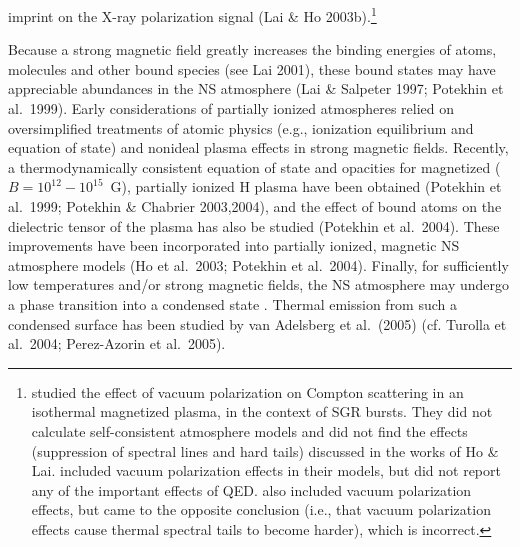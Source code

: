 \documentclass[useAMS,onecolumn,usenatbib,usegraphicx]{mn2e}
\begin{document}
%
imprint on the X-ray polarization signal (Lai \& Ho 2003b).\footnote{\citet[][]{BulikMiller97a} 
studied the effect of vacuum polarization on Compton scattering in an isothermal magnetized 
plasma, in the context of SGR bursts.  They did not calculate self-consistent atmosphere 
models and did not find the effects (suppression of spectral lines and 
hard tails) discussed in the works of Ho \& Lai. \citet[][]{Zaneetal01a} included vacuum 
polarization effects in their models, but did not report any of the important effects of QED. 
\citet[][]{Ozel01a} also included vacuum polarization effects, but came to 
the opposite conclusion (i.e., that vacuum polarization effects cause thermal spectral 
tails to become harder), which is incorrect.}

Because a strong magnetic field greatly increases the binding 
energies of atoms, molecules and other bound species (see Lai 2001),
these bound states may have appreciable abundances in the NS atmosphere
(Lai \& Salpeter 1997; Potekhin et al.~1999). 
%
%
Early considerations of partially ionized atmospheres 
\citep[e.g.,][]{Rajagopaletal97a}
relied on oversimplified treatments of atomic physics (e.g., ionization 
equilibrium and equation of state) and
nonideal plasma effects in strong magnetic fields.  
Recently, a thermodynamically consistent equation of state and opacities 
for magnetized ($B=10^{12}-10^{15}$~G), partially ionized H plasma have been
obtained (Potekhin et al.~1999; Potekhin \& Chabrier 2003,2004),
and the effect of bound atoms on the dielectric tensor of the plasma
has also be studied (Potekhin et al.~2004). These improvements 
have been incorporated 
%
%
into partially ionized, magnetic NS atmosphere models 
(Ho et al.~2003; Potekhin et al.~2004). Finally, for sufficiently 
low temperatures and/or strong magnetic fields, the NS atmosphere
may undergo a phase transition into a condensed state 
%
%
\citep[see][]{Ruderman71a,Jones86a,Neuhauseretal87a,LaiSalpeter97a,Lai01a,
MedinLai06a,MedinLai06b}.
% 
Thermal emission from such a condensed surface has been studied by van
Adelsberg et al.~(2005) (cf. Turolla et al.~2004; Perez-Azorin et
al.~2005).

\end{document}
